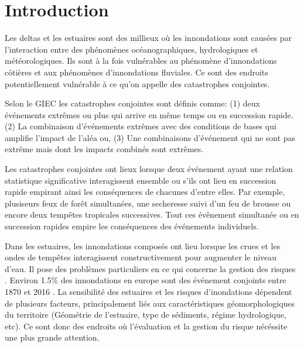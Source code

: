 \documentclass[12pt]{article}   %
\begin{document}
%

\section{Introduction} %

Les deltas et les estuaires sont des millieux où les innondations sont causées par l'interaction entre des phénomènes océanographiques, hydrologiques et météorologiques. Ils sont à la fois vulnérables au phénomène d'innondations côtières et aux phénomènes d'innondations fluviales. Ce sont des endroits potentiellement vulnérable à ce qu'on appelle des catastrophes conjointes.
\par
Selon le GIEC les catastrophes conjointes sont définis comme: (1) deux événements extrêmes ou plus qui arrive en même temps ou en succession rapide. (2) La combinaison d'événements extrêmes avec des conditions de bases qui amplifie l'impact de l'aléa ou, (3) Une combinaisons d'événement qui ne sont pas extrême mais dont les impacts combinés sont extrêmes.\cite{Lal2012} 
\par
Les catastrophes conjointes ont lieux lorsque deux événement ayant une relation statistique significative interagissent ensemble ou s'ils ont lieu en succession rapide empirant ainsi les conséquences de chacunes d'entre elles. Par exemple, plusiseurs feux de forêt simultanées, une secheresse suivi d'un feu de brousse ou encore deux tempêtes tropicales successives. Tout ces évênement simultanée ou en succession rapides empire les conséquences des événements individuels. \cite{Leonard2014} 
\par
Dans les estuaires, les innondations composés ont lieu lorsque les crues et les ondes de tempêtes interagissent constructivement pour augmenter le niveau d'eau. Il pose des problèmes particuliers en ce qui concerne la gestion des risques  \cite{Zscheischler2018}. Environ 1.5$\%$ des innondations en europe sont des événement conjoints entre 1870 et 2016 \cite{Paprotny2018b}.  La sensibilité des estuaires et les risques d'inondations dépendent de plusieurs facteurs, principalement liés aux caractéristiques géomorphologiques du territoire (Géométrie de l'estuaire, type de sédiments, régime hydrologique, etc). Ce sont donc des endroits où l'évaluation et la gestion du risque nécéssite une plus grande attention.
\end{document}
